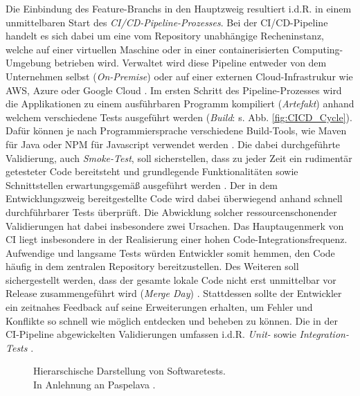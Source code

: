 \vspace*{-10mm}
Die Einbindung des Feature-Branchs in den Hauptzweig resultiert i.d.R. in einem unmittelbaren Start des \textit{CI/CD-Pipeline-Prozesses}. Bei der CI/CD-Pipeline handelt es sich dabei um eine vom Repository unabhängige Recheninstanz, welche auf einer virtuellen Maschine oder in einer containerisierten Computing-Umgebung betrieben wird. Verwaltet wird diese Pipeline entweder von dem Unternehmen selbst (\textit{On-Premise}) oder auf einer externen Cloud-Infrastrukur wie AWS, Azure oder Google Cloud \cite[Kap. 1.2]{Labouardy.2021}. Im ersten Schritt des Pipeline-Prozesses wird die Applikationen zu einem ausführbaren Programm kompiliert (\textit{Artefakt}) anhand welchem verschiedene Tests ausgeführt werden (\textit{Build}: s. Abb. \ref*{fig:CICD_Cycle}). Dafür können je nach Programmiersprache verschiedene Build-Tools, wie Maven für Java oder NPM für Javascript verwendet werden \cite[Kap. 7.1]{Labouardy.2021}. Die dabei durchgeführte Validierung, auch \textit{Smoke-Test}, soll sicherstellen, dass zu jeder Zeit ein rudimentär getesteter Code bereitsteht und grundlegende Funktionalitäten sowie Schnittstellen erwartungsgemäß ausgeführt werden \cite[19]{Halstenberg.2020}. Der in dem Entwicklungszweig bereitgestellte Code wird dabei überwiegend anhand schnell durchführbarer Tests überprüft. Die Abwicklung solcher ressourcenschonender Validierungen hat dabei insbesondere zwei Ursachen. Das Hauptaugenmerk von CI liegt insbesondere in der Realisierung einer hohen Code-Integrationsfrequenz. Aufwendige und langsame Tests würden Entwickler somit hemmen, den Code häufig in dem zentralen Repository bereitzustellen. Des Weiteren soll sichergestellt werden, dass der gesamte lokale Code nicht erst unmittelbar vor Release zusammengeführt wird (\textit{Merge Day}) \cite{.20230308}. Stattdessen sollte der Entwickler ein zeitnahes Feedback auf seine Erweiterungen erhalten, um Fehler und Konflikte so schnell wie möglich entdecken und beheben zu können. Die in der CI-Pipeline abgewickelten Validierungen umfassen i.d.R. \textit{Unit-} sowie \textit{Integration-Tests} \cite[Kap. 1.2]{Labouardy.2021}.
\begin{center}
	\begin{figure}[H]
		\centering
		\caption[Hierarschische Darstellung von Softwaretests]{Hierarschische Darstellung von Softwaretests.\\ \hspace{0.5cm}In Anlehnung an Paspelava \cite{Exposit.2021}.}
		\label{fig:Tests}
	\end{figure}
\end{center}
